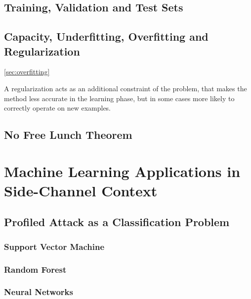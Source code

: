 \subsection{Training, Validation and Test Sets}
\subsection{Capacity, Underfitting, Overfitting and Regularization}\ref{sec:overfitting}

A regularization acts as an additional constraint of the problem, that makes the method less accurate in the learning phase, but in some cases more likely to correctly operate on new examples.
\subsection{No Free Lunch Theorem}\label{sec:NFL}


\section{Machine Learning Applications in Side-Channel Context}
\subsection{Profiled Attack as a Classification Problem}
\subsubsection{Support Vector Machine}
\subsubsection{Random Forest}
\subsubsection{Neural Networks}

